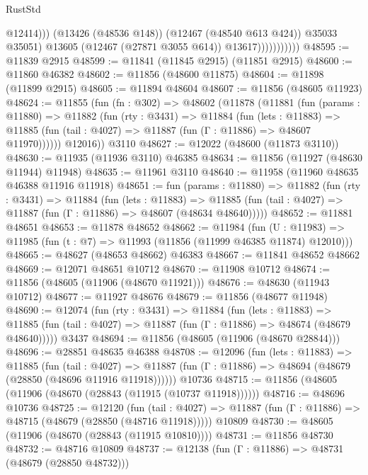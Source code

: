 \begin{lexlean}{RustStd}
\begin{coremodule}
                                  @12414)))
                            (@13426 (@48536 @148))
                            (@12467 (@48540 @613 @424))
                            @35033
                            @35051)
                          @13605
                          (@12467 (@27871 @3055 @614))
                          @13617)))))))))))
@48595 := @11839 @2915
@48599 := @11841 (@11845 @2915) (@11851 @2915)
@48600 := @11860 @46382
@48602 := @11856 (@48600 @11875)
@48604 := @11898 (@11899 @2915)
@48605 := @11894 @48604
@48607 := @11856 (@48605 @11923)
@48624 := @11855
    (fun (fn : @302) =>
    @48602
      (@11878
        (@11881
          (fun (params : @11880) =>
          @11882
            (fun (rty : @3431) =>
            @11884
              (fun (lets : @11883) =>
              @11885 (fun (tail : @4027) => @11887 (fun (Γ : @11886) => @48607 @11970))))))
        @12016))
    @3110
@48627 := @12022 (@48600 (@11873 @3110))
@48630 := @11935 (@11936 @3110) @46385
@48634 := @11856 (@11927 (@48630 @11944) @11948)
@48635 := @11961 @3110
@48640 := @11958 (@11960 @48635 @46388 @11916 @11918)
@48651 := fun (params : @11880) =>
  @11882
    (fun (rty : @3431) =>
    @11884
      (fun (lets : @11883) =>
      @11885 (fun (tail : @4027) => @11887 (fun (Γ : @11886) => @48607 (@48634 @48640)))))
@48652 := @11881 @48651
@48653 := @11878 @48652
@48662 := @11984
    (fun (U : @11983) => @11985 (fun (t : @7) => @11993 (@11856 (@11999 @46385 @11874) @12010)))
@48665 := @48627 (@48653 @48662) @46383
@48667 := @11841 @48652 @48662
@48669 := @12071 @48651 @10712
@48670 := @11908 @10712
@48674 := @11856 (@48605 (@11906 (@48670 @11921)))
@48676 := @48630 (@11943 @10712)
@48677 := @11927 @48676
@48679 := @11856 (@48677 @11948)
@48690 := @12074
    (fun (rty : @3431) =>
    @11884
      (fun (lets : @11883) =>
      @11885 (fun (tail : @4027) => @11887 (fun (Γ : @11886) => @48674 (@48679 @48640)))))
    @3437
@48694 := @11856 (@48605 (@11906 (@48670 @28844)))
@48696 := @28851 @48635 @46388
@48708 := @12096
    (fun (lets : @11883) =>
    @11885
      (fun (tail : @4027) =>
      @11887 (fun (Γ : @11886) => @48694 (@48679 (@28850 (@48696 @11916 @11918))))))
    @10736
@48715 := @11856 (@48605 (@11906 (@48670 (@28843 (@11915 (@10737 @11918))))))
@48716 := @48696 @10736
@48725 := @12120
    (fun (tail : @4027) => @11887 (fun (Γ : @11886) => @48715 (@48679 (@28850 (@48716 @11918)))))
    @10809
@48730 := @48605 (@11906 (@48670 (@28843 (@11915 @10810))))
@48731 := @11856 @48730
@48732 := @48716 @10809
@48737 := @12138 (fun (Γ : @11886) => @48731 (@48679 (@28850 @48732)))

\end{coremodule}
\end{lexlean}
